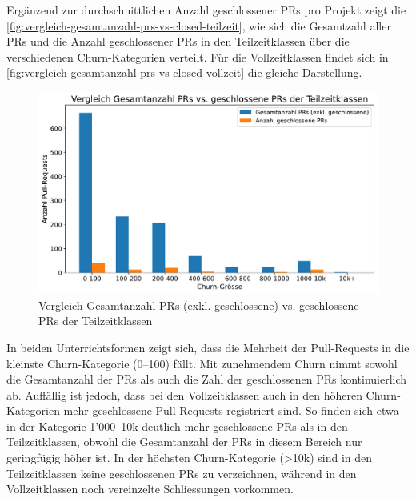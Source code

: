 Ergänzend zur durchschnittlichen Anzahl geschlossener PRs pro Projekt zeigt die \autoref{fig:vergleich-gesamtanzahl-prs-vs-closed-teilzeit}, wie sich die Gesamtzahl aller PRs und die Anzahl geschlossener PRs in den Teilzeitklassen über die verschiedenen Churn-Kategorien verteilt. Für die Vollzeitklassen findet sich in \autoref{fig:vergleich-gesamtanzahl-prs-vs-closed-vollzeit} die gleiche Darstellung.

\begin{figure}[htbp]
    \includegraphics[width=\textwidth]{Figures/vergleich-gesamtanzahl-prs-vs-closed-teilzeit.pdf}
    \caption{Vergleich Gesamtanzahl PRs (exkl. geschlossene) vs. geschlossene PRs der Teilzeitklassen}
    \label{fig:vergleich-gesamtanzahl-prs-vs-closed-teilzeit}
\end{figure}


In beiden Unterrichtsformen zeigt sich, dass die Mehrheit der Pull-Requests in die kleinste Churn-Kategorie (0–100) fällt. Mit zunehmendem Churn nimmt sowohl die Gesamtanzahl der PRs als auch die Zahl der geschlossenen PRs kontinuierlich ab. Auffällig ist jedoch, dass bei den Vollzeitklassen auch in den höheren Churn-Kategorien mehr geschlossene Pull-Requests registriert sind. So finden sich etwa in der Kategorie 1'000–10k deutlich mehr geschlossene PRs als in den Teilzeitklassen, obwohl die Gesamtanzahl der PRs in diesem Bereich nur geringfügig höher ist.
In der höchsten Churn-Kategorie (>10k) sind in den Teilzeitklassen keine geschlossenen PRs zu verzeichnen, während in den Vollzeitklassen noch vereinzelte Schliessungen vorkommen. 

